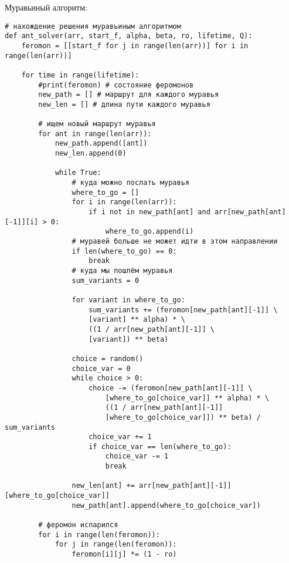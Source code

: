 \documentclass[12pt,a4paper]{scrartcl}
\begin{document}
Муравьиный алгоритм:
\begin{verbatim}
# нахождение решения муравьиным алгоритмом
def ant_solver(arr, start_f, alpha, beta, ro, lifetime, Q):
    feromon = [[start_f for j in range(len(arr))] for i in range(len(arr))]

    for time in range(lifetime):
        #print(feromon) # состояние феромонов
        new_path = [] # маршрут для каждого муравья
        new_len = [] # длина пути каждого муравья

        # ищем новый маршрут муравья
        for ant in range(len(arr)):
            new_path.append([ant])
            new_len.append(0)
            
            while True:
                # куда можно послать муравья
                where_to_go = []
                for i in range(len(arr)):
                    if i not in new_path[ant] and arr[new_path[ant][-1]][i] > 0:
                        where_to_go.append(i)
                # муравей больше не может идти в этом направлении
                if len(where_to_go) == 0:
                    break
                # куда мы пошлём муравья
                sum_variants = 0
                
                for variant in where_to_go:
                    sum_variants += (feromon[new_path[ant][-1]] \ 
                    [variant] ** alpha) * \
                    ((1 / arr[new_path[ant][-1]] \ 
                    [variant]) ** beta)

                choice = random()
                choice_var = 0
                while choice > 0:
                    choice -= (feromon[new_path[ant][-1]] \ 
                        [where_to_go[choice_var]] ** alpha) * \
                        ((1 / arr[new_path[ant][-1]]
                        [where_to_go[choice_var]]) ** beta) / sum_variants
                    choice_var += 1
                    if choice_var == len(where_to_go):
                        choice_var -= 1
                        break

                new_len[ant] += arr[new_path[ant][-1]][where_to_go[choice_var]]
                new_path[ant].append(where_to_go[choice_var])                        

        # феромон испарился
        for i in range(len(feromon)):
            for j in range(len(feromon)):
                feromon[i][j] *= (1 - ro)


\end{verbatim}
\end{document}
